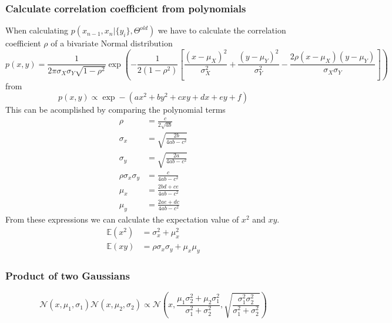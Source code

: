\documentclass[%
 reprint,
 amsmath,amssymb,
 aps,
]{revtex4-1}
\begin{document}
\subsubsection{Calculate correlation coefficient from polynomials}
When calculating $p\left( x_{n-1},x_{n}|\{y_{i}\},\Theta^{old}\right)$ we have to calculate the correlation coefficient $\rho$ of a bivariate Normal distribution
\begin{equation}
    p(x,y) =
      \frac{1}{2 \pi  \sigma_X \sigma_Y \sqrt{1-\rho^2}}
      \exp\left(
        -\frac{1}{2(1-\rho^2)}\left[
          \frac{(x-\mu_X)^2}{\sigma_X^2} +
          \frac{(y-\mu_Y)^2}{\sigma_Y^2} -
          \frac{2\rho(x-\mu_X)(y-\mu_Y)}{\sigma_X \sigma_Y}
      \right]\right)
\end{equation}
from
\begin{equation}
	p(x,y) \propto \exp-\left(ax^{2}+by^{2}+cxy+dx+ey+f\right)
\end{equation}
This can be acomplished by comparing the polynomial terms
\begin{equation}
	\begin{aligned}
	\rho &= \frac{c}{2\sqrt{ab}}\\
	\sigma_{x} &=\sqrt{\frac{2b}{4ab-c^2}}\\
	\sigma_{y} &=\sqrt{\frac{2a}{4ab-c^2}}\\
	\rho \sigma_{x} \sigma_{y} &= \frac{c}{4ab-c^2}\\
	\mu_x &= \frac{2bd+ce}{4ab-c^2}\\
	\mu_y &= \frac{2ae+dc}{4ab-c^2}
	\end{aligned}
\end{equation}
From these expressions we can calculate the expectation value of $x^2$ and $xy$.
\begin{equation}
	\begin{aligned}
	\mathbb{E}(x^2) &= \sigma_{x}^2 + \mu_{x}^2\\
	\mathbb{E}(xy) &= \rho \sigma_{x} \sigma_{y} + \mu_{x}\mu_{y}
	\end{aligned}
\end{equation}

\subsubsection{Product of two Gaussians}
\begin{equation}
\mathcal{N}(x,\mu_{1},\sigma_{1})\mathcal{N}(x,\mu_{2},\sigma_{2}) 
\propto \mathcal{N}\left(x,\frac{\mu_{1}\sigma_{2}^{2}+\mu_{2}\sigma_{1}^{2}}{\sigma_{1}^2+\sigma_{2}^2},\sqrt{\frac{\sigma_{1}^2\sigma_{2}^2}{\sigma_{1}^2+\sigma_{2}^2}}\right)
\end{equation}
\end{document}
